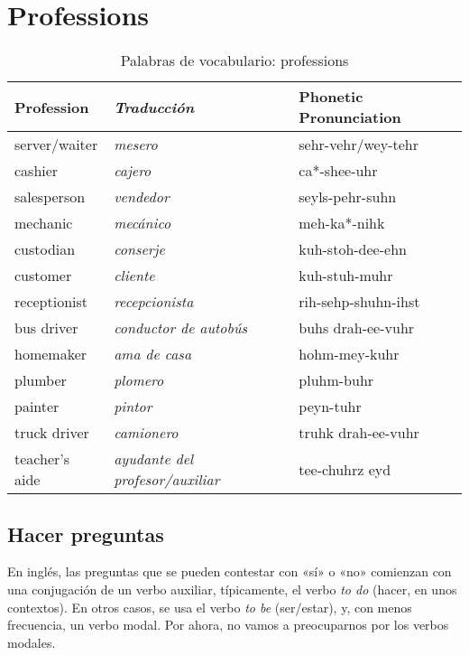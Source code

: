 \chapter{Professions}

\begin{table}[H]
	\centering
	\begin{tabular}{lll}
	\toprule
		\textbf{Profession} & \textbf{\emph{Traducci\'on}} & \textbf{Phonetic Pronunciation}\\
	\midrule
		server/waiter & \emph{mesero} & sehr-vehr/wey-tehr \\
		cashier & \emph{cajero} & ca*-shee-uhr \\
		salesperson & \emph{vendedor} & seyls-pehr-suhn \\
		mechanic & \emph{mecánico} & meh-ka*-nihk \\
		custodian & \emph{conserje} & kuh-stoh-dee-ehn \\
		customer & \emph{cliente} & kuh-stuh-muhr \\
		receptionist & \emph{recepcionista} & rih-sehp-shuhn-ihst \\
		bus driver & \emph{conductor de autobús} & buhs drah-ee-vuhr \\
		homemaker & \emph{ama de casa} & hohm-mey-kuhr \\
		plumber & \emph{plomero} & pluhm-buhr\\
		painter & \emph{pintor} & peyn-tuhr \\
		truck driver & \emph{camionero} & truhk drah-ee-vuhr \\
		teacher's aide & \emph{ayudante del profesor/auxiliar} & tee-chuhrz eyd \\
	\bottomrule
	\end{tabular}
	\caption{Palabras de vocabulario: professions}
\end{table}

\section{Hacer preguntas}%
\label{sec:Hacer preguntas}

En ingl\'es, las preguntas que se pueden contestar con «s\'i» o «no» comienzan con una conjugaci\'on de un verbo auxiliar, t\'ipicamente, el verbo \emph{to do} (hacer, en unos contextos).
En otros casos, se usa el verbo \emph{to be} (ser/estar), y, con menos frecuencia, un verbo modal.
Por ahora, no vamos a preocuparnos por los verbos modales.\\


